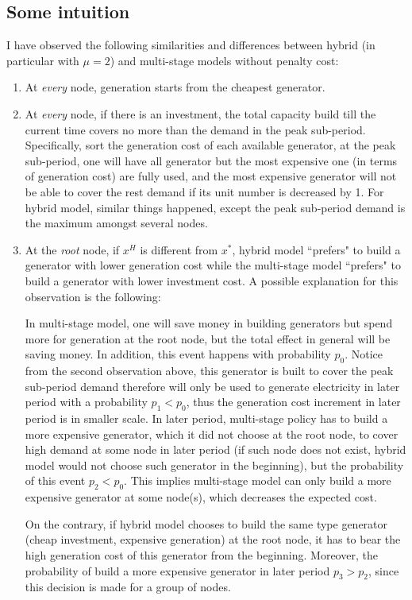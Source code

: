 \documentclass[10pt]{article}
\theoremstyle{plain}
\theoremstyle{definition}
\theoremstyle{remark}
\begin{document}
\subsection*{Some intuition}
I have observed the following similarities and differences between
hybrid (in particular with $\mu=2$) and multi-stage models without penalty cost:
\begin{enumerate}
\item At \emph{every} node, generation starts from the cheapest generator.
\item At \emph{every} node, if there is an investment, the total capacity build till the current time
covers no more than the demand in the peak sub-period.
Specifically, sort the generation cost of each available generator,
at the peak sub-period, one will have all generator but the most expensive one (in terms
of generation cost) are fully used, and the most expensive generator will not be able to
cover the rest demand if its unit number is decreased by 1.
For hybrid model, similar things happened, except the peak sub-period demand 
is the maximum amongst several nodes.
\item At the \emph{root} node, if $x^H$ is different from $x^*$, hybrid model ``prefers" to build
a generator with lower generation cost while the multi-stage model ``prefers" to build
a generator with lower investment cost.
A possible explanation for this observation is the following:

In multi-stage model, one will save money
in building generators but spend more for generation at the root node, but the total effect 
in general will be saving money. In addition, this event happens with probability $p_0$.
Notice from the second observation above, this generator is built to cover the peak sub-period
demand therefore will only be used to generate electricity in later period with a probability
$p_1<p_0$, thus the generation cost increment in later period is in smaller scale.
In later period, multi-stage policy has to build a more expensive generator, which it did not
choose at the root node, to cover high demand at some node in later period (if such node
does not exist, hybrid model would not choose such generator in the beginning),
but the probability of this event $p_2 < p_0$. This implies multi-stage model can only build
a more expensive generator at some node(s), which decreases the expected cost.

On the contrary, if hybrid model chooses to build the same type generator (cheap investment,
expensive generation) at the root node, it has to bear the high generation cost of this
generator from the beginning. Moreover, the probability of build a more expensive generator
in later period $p_3 > p_2$, since this decision is made for a group of nodes.
\end{enumerate}
\end{document}
